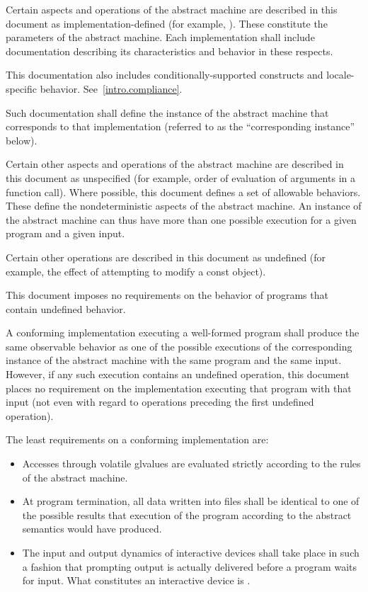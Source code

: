 \pnum
{}%
Certain aspects and operations of the abstract machine are described in this
document as implementation-defined (for example,
). These constitute the parameters of the abstract machine.
Each implementation shall include documentation describing its characteristics
and behavior in these respects.
\begin{footnote}
This documentation also includes
conditionally-supported constructs and locale-specific behavior.
See~\ref{intro.compliance}.
\end{footnote}
Such documentation shall define the instance of the
abstract machine that corresponds to that implementation (referred to as the
``corresponding instance'' below).

\pnum
{}%
Certain other aspects and operations of the abstract machine are
described in this document as unspecified (for example,
order of evaluation of arguments in a function call).
Where possible, this
document defines a set of allowable behaviors. These
define the nondeterministic aspects of the abstract machine. An instance
of the abstract machine can thus have more than one possible execution
for a given program and a given input.

\pnum
{}%
Certain other operations are described in this document as
undefined (for example, the effect of
attempting to modify a const object).
\begin{note}
This document imposes no requirements on the
behavior of programs that contain undefined behavior.
\end{note}

\pnum
{}%
%
A conforming implementation executing a well-formed program shall
produce the same observable behavior as one of the possible executions
of the corresponding instance of the abstract machine with the
same program and the same input.
%
However, if any such execution contains an undefined operation, this document places no
requirement on the implementation executing that program with that input
(not even with regard to operations preceding the first undefined
operation).

\pnum
{}%
The least requirements on a conforming implementation are:
\begin{itemize}
\item
Accesses through volatile glvalues are evaluated strictly according to the
rules of the abstract machine.
\item
At program termination, all data written into files shall be
identical to one of the possible results that execution of the program
according to the abstract semantics would have produced.
\item
The input and output dynamics of interactive devices shall take
place in such a fashion that prompting output is actually delivered before a program waits for input. What constitutes an interactive device is
.
\end{itemize}

